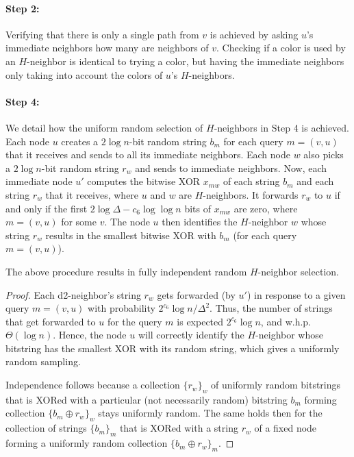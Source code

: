 \paragraph{Step 2:}
Verifying that there is only a single path from $v$ is achieved by asking $u$'s immediate neighbors how many are neighbors of $v$. Checking if a color is used by an $H$-neighbor is identical to trying a color, but having the immediate neighbors only taking into account the colors of $u$'s $H$-neighbors.
\paragraph{Step 4:} We detail how the uniform random selection of $H$-neighbors in Step 4 is achieved. Each node $u$ creates a $2\log n$-bit random string $b_m$ for each query $m=(v,u)$ that it receives and sends to all its immediate neighbors. Each node $w$ also picks a $2\log n$-bit random string $r_w$ and sends to immediate neighbors. Now, each immediate node $u'$ computes the bitwise XOR $x_{mw}$ of each string $b_m$ and each string $r_w$ that it receives, where $u$ and $w$ are $H$-neighbors. It forwards $r_w$ to $u$ if and only if the first $2\log \Delta - c_6 \log\log n$ bits of $x_{mw}$ are zero, where $m=(v,u)$ for some $v$. The node $u$ then identifies the $H$-neighbor $w$ whose string $r_w$ results in the smallest bitwise XOR with $b_m$ (for each query $m=(v,u)$). 

\begin{lemma}
The above procedure results in fully independent random $H$-neighbor selection.
\label{L:rand-nbor}
\end{lemma}
\begin{proof}
Each d2-neighbor's string $r_w$ gets forwarded (by $u'$) in response to a given query $m=(v,u)$ with probability $2^{c_6}\log n / \Delta^2$. Thus, the number of strings that get forwarded to $u$ for the query $m$ is expected $2^{c_6} \log n$, and w.h.p. $\Theta(\log n)$. Hence, the node $u$ will correctly identify the $H$-neighbor whose bitstring has the smallest XOR with its random string, which gives a uniformly random sampling.

Independence follows because a collection $\{r_w\}_w$ of uniformly random bitstrings that is XORed with a particular (not necessarily random) bitstring $b_m$ forming collection $\{ b_m \oplus r_w\}_w$ stays uniformly random.
The same holds then for the collection of strings $\{b_m\}_m$
that is XORed with a string $r_w$ of a fixed node forming a uniformly random collection $\{b_m \oplus r_w\}_m$. 
\end{proof}


